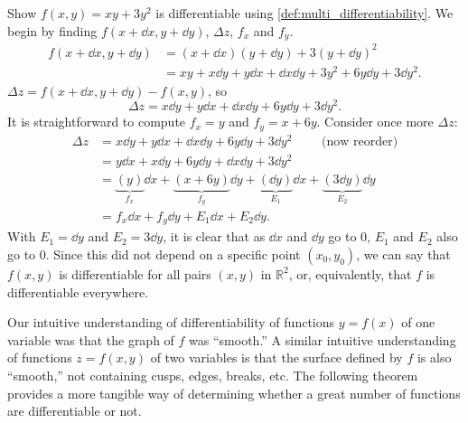 \begin{example}\label{ex_totaldiff1}%
Show $f(x,y) = xy+3y^2$ is differentiable using \autoref{def:multi_differentiability}.
\solution
We begin by finding $f(x+\dd x,y+\dd y)$, $\Delta z$, $f_x$ and $f_y$.
\begin{align*}
f(x+\dd x,y+\dd y) &= (x+\dd x)(y+\dd y) + 3(y+\dd y)^2 \\
						&= xy + x\dd y+y\dd x+\dd x \dd y + 3y^2+6y\dd y+3\dd y^2.
\end{align*}
$\Delta z = f(x+\dd x,y+\dd y) - f(x,y)$, so
\[\Delta z = x\dd y + y\dd x + \dd x \dd y + 6y\dd y+3\dd y^2.\]
It is straightforward to compute $f_x = y$ and $f_y = x+6y$. Consider once more $\Delta z$:
\begin{align*}
\Delta z &= x\dd y + y\dd x + \dd x \dd y + 6y\dd y+3\dd y^2 \qquad \text{ (now reorder)}\\
		&= y\dd x + x\dd y+6y\dd y+ \dd x \dd y + 3\dd y^2\\
		&= \underbrace{(y)}_{f_x}\dd x + \underbrace{(x+6y)}_{f_y}\dd y + \underbrace{(\dd y)}_{E_1}\dd x+\underbrace{(3\dd y)}_{E_2}\dd y\\
		&= f_x\dd x + f_y\dd y + E_1\dd x+E_2\dd y.
\end{align*}
With $E_1 = \dd y$ and $E_2 = 3\dd y$, it is clear that as $\dd x$ and $\dd y$ go to 0, $E_1$ and $E_2$ also go to 0. Since this did not depend on a specific point $(x_0,y_0)$, we can say that $f(x,y)$ is differentiable for all pairs $(x,y)$ in $\mathbb{R}^2$, or, equivalently, that $f$ is differentiable everywhere.
\end{example}

Our intuitive understanding of differentiability of functions $y=f(x)$ of one variable was that the graph of $f$ was ``smooth.'' A similar intuitive understanding of functions $z=f(x,y)$ of two variables is that the surface defined by $f$ is also ``smooth,'' not containing cusps, edges, breaks,  etc. The following theorem
provides a more tangible way of determining whether a great number of functions are differentiable or not.


